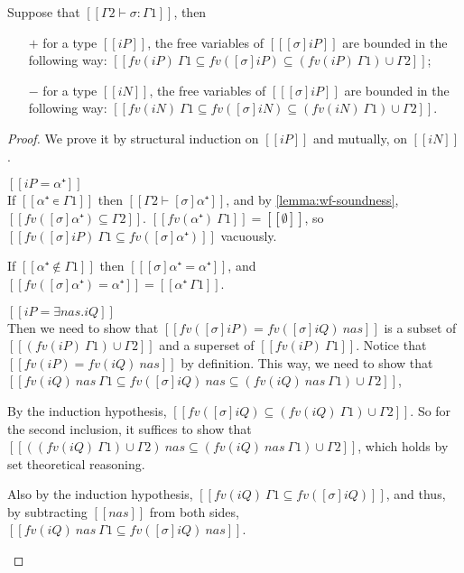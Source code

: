 \begin{lemma}
  \label{lemma:subst-fv}
  Suppose that $[[Γ2 ⊢ σ : Γ1]]$, then
  \begin{enumerate}
    \item [$+$] for a type $[[iP]]$,
      the free variables of $[[ [σ]iP ]]$ are bounded in the following way:
     $[[fv(iP) \ {Γ1} ⊆ fv([σ]iP) ⊆ (fv(iP) \ {Γ1}) ∪ {Γ2}]]$;
    \item [$-$] for a type $[[iN]]$, 
      the free variables of $[[ [σ]iP ]]$ are bounded in the following way:
      $[[fv(iN) \ {Γ1} ⊆ fv([σ]iN) ⊆ (fv(iN) \ {Γ1}) ∪ {Γ2}]]$.
  \end{enumerate}
\end{lemma}
\begin{proof}
  We prove it by structural induction on 
  $[[iP]]$ and mutually, on $[[iN]]$.
  \begin{caseof}
    \item $[[iP = α⁺]]$\\
      If $[[α⁺ ∊ {Γ1}]]$ then $[[Γ2 ⊢ [σ]α⁺]]$, and by 
      \cref{lemma:wf-soundness}, $[[fv([σ]α⁺) ⊆ {Γ2}]]$.
      $[[fv(α⁺) \ {Γ1}]] = [[∅]]$, so $[[fv([σ]iP) \ {Γ1}  ⊆ fv([σ]α⁺)]]$
      vacuously.

      If $[[α⁺ ∉ {Γ1}]]$ then $[[ [σ]α⁺ = α⁺ ]]$, and 
      $[[fv([σ]α⁺) = {α⁺}]] = [[{α⁺} \ {Γ1}]]$.
      
    \item $[[iP = ∃nas.iQ]]$\\
      Then we need to show that $[[fv([σ]iP) = fv([σ]iQ) \ {nas}]]$
      is a subset of $[[(fv(iP) \ {Γ1}) ∪ {Γ2}]]$ and a superset of
      $[[fv(iP) \ {Γ1}]]$.
      Notice that $[[fv(iP) = fv(iQ) \ {nas}]]$ by definition.
      This way, we need to show that 
      $[[fv(iQ) \ {nas} \ {Γ1} ⊆ fv([σ]iQ) \ {nas} ⊆ (fv(iQ) \ {nas} \ {Γ1}) ∪ {Γ2}]]$,
      
      By the induction hypothesis, 
      $[[fv([σ]iQ) ⊆ (fv(iQ) \ {Γ1}) ∪ {Γ2}]]$.
      So for the second inclusion, it suffices to show that
      $[[((fv(iQ) \ {Γ1}) ∪ {Γ2}) \ {nas} ⊆ (fv(iQ) \ {nas} \ {Γ1}) ∪ {Γ2}]]$,
      which holds by set theoretical reasoning. 

      Also by the induction hypothesis,
      $[[fv(iQ) \ {Γ1} ⊆ fv([σ]iQ)]]$,
      and thus, by subtracting $[[{nas}]]$ from both sides,
      $[[fv(iQ) \ {nas} \ {Γ1} ⊆ fv([σ]iQ) \ {nas}]]$.


\end{caseof}
\end{proof}
